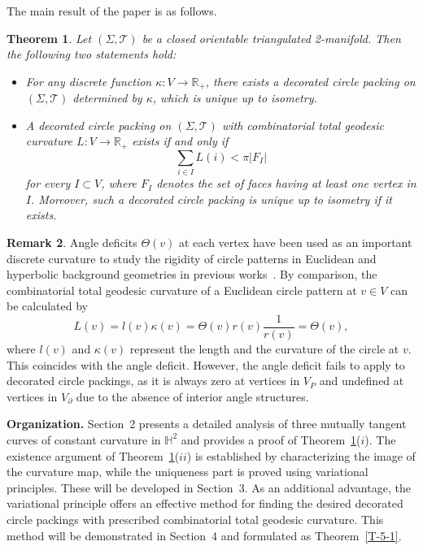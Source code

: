 \documentclass[11pt,leqno]{article}
\numberwithin{equation}{section}
\newtheorem{theorem}{Theorem}[section]
\theoremstyle{definition}
\newtheorem{remark}[theorem]{Remark}
\begin{document}
The main result of the paper is as follows.
\begin{theorem}\label{T-1-1}
Let $(\Sigma,\mathcal T)$ be a closed orientable triangulated 2-manifold. Then the following two statements hold:
 \begin{itemize}
 \item[($i$)] For any discrete function $\kappa:V\to\mathbb{R}_+$,  there exists a decorated circle packing on  $(\Sigma,\mathcal T)$ determined by $\kappa$, which is unique up to isometry.
     \item[($ii$)] A decorated circle packing on  $(\Sigma,\mathcal T)$ with combinatorial total geodesic curvature $L:V\to\mathbb{R}_+$ exists if and only if
          \[\sum_{i\in I} L(i)<\pi\vert F_I\vert\]
for every $I\subset V$, where $F_I$ denotes the set of faces having at least one vertex in $I$.  Moreover, such a decorated circle packing is unique up to isometry if it exists.
 \end{itemize}
\end{theorem}
\begin{remark}
Angle deficits $\Theta(v)$ at each vertex have been used as an important discrete curvature to study the rigidity of circle patterns in Euclidean and hyperbolic background geometries in previous works~\cite{MR1435975,MR3810260,MR4334399}. By comparison, the combinatorial total geodesic curvature of a Euclidean circle pattern at $v\in V$ can be calculated by
\[L(v)=l(v)\kappa(v)=\Theta(v)r(v)\frac{1}{r(v)}=\Theta(v),\]
where $l(v)$ and $\kappa(v)$ represent the length and the curvature of the circle at $v$. This coincides with the angle deficit.
However, the angle deficit fails to apply to decorated circle packings, as it is always zero at vertices in \(V_P\) and undefined at vertices in \(V_\partial\) due to the absence of interior angle structures.
\end{remark}
\textbf{Organization.} Section~2 presents a detailed analysis of three mutually tangent curves of constant curvature in $\mathbb{H}^2$ and provides a proof of Theorem~\ref{T-1-1}($i$). The existence argument of Theorem~\ref{T-1-1}($ii$) is established by characterizing the image of the curvature map, while the uniqueness part is proved using variational principles. These will be developed in Section~3. As an additional advantage, the variational principle offers an effective method for finding the desired decorated circle packings with prescribed combinatorial total geodesic curvature. This method will be demonstrated in Section~4 and formulated as Theorem~\ref{T-5-1}.
\end{document}
